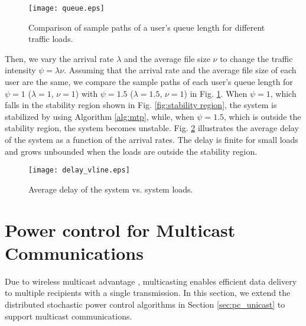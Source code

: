 \documentclass[10pt,journal,letterpaper,compsoc]{IEEEtran}
\begin{document}
{{\begin{figure}[t]
\begin{center}
\vspace{-0.0cm}\hspace{0cm} {\texttt{[image: queue.eps]}}\hspace{-0cm}
\vspace{0cm} \caption{Comparison of sample paths of a user's queue length for different traffic loads.}\vspace{-0.0cm}
\label{fig:queue}
\end{center}
\end{figure}


Then, we vary the arrival rate $\lambda$ and the average file size $\nu$ to change the traffic intensity $\psi=\lambda\nu$. Assuming that the arrival rate and the average file size of each user are the same, we compare the sample paths of each user's queue length for $\psi=1$ ($\lambda=1$, $\nu=1$) with $\psi=1.5$ ($\lambda=1.5$, $\nu=1$) in Fig. \ref{fig:queue}. When $\psi=1$, which falls in the stability region shown in Fig. \ref{fig:stability region}, the system is stabilized by using Algorithm \ref{alg:mtp}, while, when $\psi=1.5$, which is outside the stability region, the system becomes unstable. Fig. \ref{fig:delay} illustrates the average delay of the system as a function of the arrival rates. The delay is finite for small loads and grows unbounded when the loads are outside the stability region.

\begin{figure}[t]
\begin{center}
\vspace{-0.0cm}\hspace{0cm} {\texttt{[image: delay\_vline.eps]}}\hspace{-0cm}
\vspace{0cm} \caption{Average delay of the system vs. system loads.}\vspace{-0.0cm}
\label{fig:delay}
\end{center}
\end{figure}



\section{Power control for Multicast Communications}\label{sec:multicast}
Due to wireless multicast advantage \cite{wieselthier:2000}, multicasting enables efficient data delivery to multiple recipients with a single transmission. In this section, we extend the distributed stochastic power control algorithms in Section \ref{sec:pc_unicast} to support multicast communications.

}}
\end{document}
